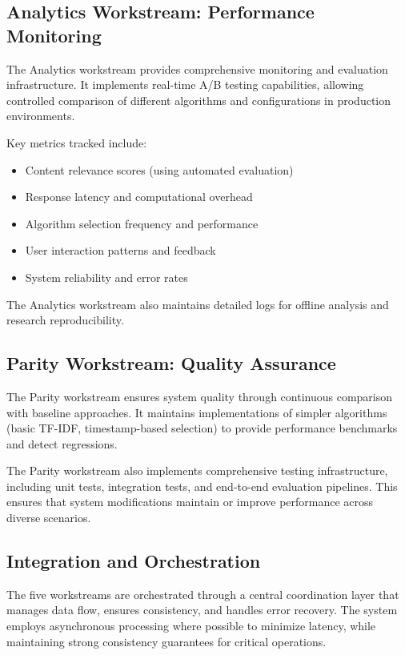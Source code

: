 \documentclass[conference]{IEEEtran}
\begin{document}
\subsection{Analytics Workstream: Performance Monitoring}

The Analytics workstream provides comprehensive monitoring and evaluation infrastructure. It implements real-time A/B testing capabilities, allowing controlled comparison of different algorithms and configurations in production environments.

Key metrics tracked include:
\begin{itemize}
\item Content relevance scores (using automated evaluation)
\item Response latency and computational overhead
\item Algorithm selection frequency and performance
\item User interaction patterns and feedback
\item System reliability and error rates
\end{itemize}

The Analytics workstream also maintains detailed logs for offline analysis and research reproducibility.

\subsection{Parity Workstream: Quality Assurance}

The Parity workstream ensures system quality through continuous comparison with baseline approaches. It maintains implementations of simpler algorithms (basic TF-IDF, timestamp-based selection) to provide performance benchmarks and detect regressions.

The Parity workstream also implements comprehensive testing infrastructure, including unit tests, integration tests, and end-to-end evaluation pipelines. This ensures that system modifications maintain or improve performance across diverse scenarios.

\subsection{Integration and Orchestration}

The five workstreams are orchestrated through a central coordination layer that manages data flow, ensures consistency, and handles error recovery. The system employs asynchronous processing where possible to minimize latency, while maintaining strong consistency guarantees for critical operations.
\end{document}
